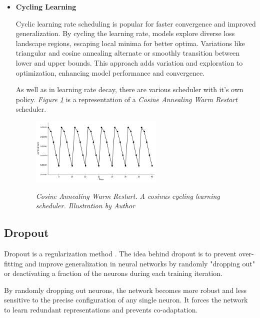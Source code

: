 \begin{itemize}
    \newpage

  \item \textbf{Cycling Learning}

    Cyclic learning rate scheduling is popular for faster convergence and
    improved generalization. By cycling the learning rate, models explore
    diverse loss landscape regions, escaping local minima for better optima.
    Variations like triangular and cosine annealing alternate or smoothly
    transition between lower and upper bounds. This approach adds variation
    and exploration to optimization, enhancing model performance and
    convergence. \newline

    As well as in learning rate decay, there are various scheduler with it's
    own policy. \textit{Figure \ref{fig:cycling-rate-decay}} is a
    representation of a \textit{Cosine Annealing Warm Restart} scheduler.
    \begin{figure}[H] \centering
      \includegraphics[width=0.6\textwidth]{imatges/preliminaries/CosineAnnealingWarmRestarts-scheduler.png}
      \caption[Cosine Annealing Warm Restart]{\textit{Cosine Annealing Warm
      Restart. A cosinus cycling learning scheduler. Illustration by Author}}
    {\label{fig:cycling-rate-decay}} \end{figure} \end{itemize}

\newpage

\subsection{Dropout}

Dropout is a regularization method \cite{DropoutPaper}. The idea behind dropout
is to prevent over-fitting and improve generalization in neural networks by
randomly "dropping out" or deactivating a fraction of the neurons during
each training iteration. \newline

By randomly dropping out neurons, the network becomes more robust and less
sensitive to the precise configuration of any single neuron. It forces the
network to learn redundant representations and prevents co-adaptation.

